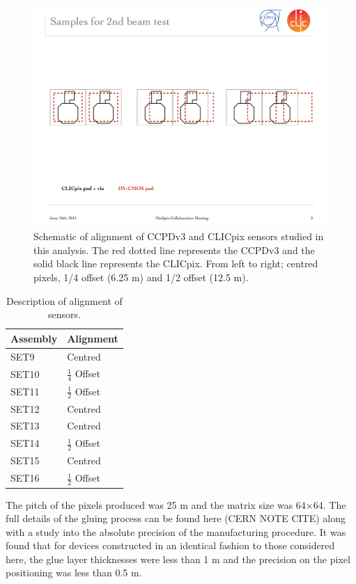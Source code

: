 \begin{figure}
\centering
\includegraphics[width=1.0\textwidth]{CLICdpVertex/Plots/misalignedPads.pdf}
\caption[Schematic of alignment of CCPDv3 and CLICpix sensors studied in this analysis.]{Schematic of alignment of CCPDv3 and CLICpix sensors studied in this analysis.  The red dotted line represents the CCPDv3 and the solid black line represents the CLICpix.  From left to right; centred pixels, 1/4 offset (6.25 {\mu}m) and 1/2 offset (12.5 {\mu}m).}
\label{fig:alignment}
\end{figure}

\begin{table}[h!]
\centering
\begin{tabular}{ l l }
\hline
Assembly & Alignment \\ 
\hline
SET9 & Centred \\
SET10 & $\frac{1}{4}$ Offset \\
SET11 & $\frac{1}{2}$ Offset \\
SET12 & Centred \\
SET13 & Centred \\
SET14 & $\frac{1}{2}$ Offset \\
SET15 & Centred \\
SET16 & $\frac{1}{2}$ Offset \\
\hline
\end{tabular}
\caption[Description of alignment of sensors.]{Description of alignment of sensors.}
\label{table:alignment}
\end{table}

The pitch of the pixels produced was 25 {\mu}m and the matrix size was 64$\times$64.  The full details of the gluing process can be found here (CERN NOTE CITE) along with a study into the absolute precision of the manufacturing procedure.  It was found that for devices constructed in an identical fashion to those considered here, the glue layer thicknesses were less than 1 {\mu}m and the precision on the pixel positioning was less than 0.5 {\mu}m.  

